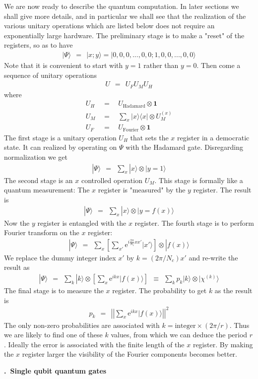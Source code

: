 \documentclass[onecolumn,fleqn, 11pt]{revtex4}
\newcommand{\eexp}{\mathrm{e}^}
\newcommand{\tbox}[1]{\text{#1}}
\newcommand{\beq}{\begin{eqnarray}}
\newcommand{\eeq}{\end{eqnarray}}
\renewcommand{\thesubsection}{\arabic{subsection}}
\renewcommand{\thesubsubsection}{\arabic{subsubsection}}
\newcommand{\sheadC}[1]
{
\addtocounter{subsubsection}{1}
\vspace{5mm}
{\bf \thesubsection.\thesubsubsection \ #1}  
\nopagebreak
\phantomsection
}
\begin{document}
We are now ready to describe the quantum computation.
In later sections we shall give more details, 
and in particular we shall see that the realization 
of the various unitary operations which are 
listed below does not require an exponentially 
large hardware.   
The preliminary stage is to make a "reset" 
of the registers, so as to have 
\beq
|\Psi \rangle \ \ = \ \ |x ; y\rangle = | 0,0,0,...,0,0 ; 1,0,0,...,0,0 \rangle
\eeq
Note that it is convenient to start with $y=1$ rather than $y=0$. 
Then come a sequence of unitary operations 
\beq
U \ \ = \ \ U_F U_M U_H
\eeq
where
\beq
U_H \ \ &=& \ \ U_{\tbox{Hadamard}} \otimes \bm{1} \\
U_M \ \ &=& \ \ \sum_x |x\rangle\langle x| \otimes  U_M^{(x)} \\
U_F \ \ &=& \ \ U_{\tbox{Fourier}} \otimes \bm{1}
\eeq
The first stage is a unitary operation $U_H$ that 
sets the $x$ register in a democratic state.
It can realized by operating on $\Psi$ with 
the Hadamard gate. Disregarding normalization we get   
\beq
|\Psi \rangle \ \ = \ \ \sum_x |x \rangle \otimes   | y{=}1 \rangle 
\eeq
The second stage is an $x$ controlled operation $U_M$.
This stage is formally like a quantum measurement: 
The $x$ register is "measured" by the $y$ register.  
The result is 
\beq
|\Psi \rangle \ \ = \ \ \sum_x |x \rangle \otimes  | y{=}f(x) \rangle 
\eeq
Now the $y$ register is entangled with the $x$ register. 
The fourth stage is to perform Fourier transform 
on the $x$ register:
\beq
|\Psi \rangle \ \ = \ \ \sum_x 
\left[ \sum_{x'}  \eexp{i\frac{2\pi}{N_c}xx'} |x' \rangle \right] 
\otimes   | f(x) \rangle 
\eeq
We replace the dummy integer index $x'$ by $k=(2\pi/N_c)x'$ 
and re-write the result as  
\beq
|\Psi \rangle \ \ = \ \ \sum_k   |k \rangle  \otimes   
\left[ \sum_x  \eexp{ikx} |f(x) \rangle \right] 
\ \ \equiv \ \ 
\sum_k p_k |k\rangle \otimes |\chi^{(k)}\rangle
\eeq
The final stage is to measure the $x$ register. 
The probability to get $k$ as the result is 
\beq  
p_k \ \ = \ \ 
\left|\left|
\sum_x  \eexp{ikx} |f(x) \rangle
\right|\right|^2 
\eeq
The only non-zero probabilities are associated 
with $k=\mbox{integer} \times (2\pi/r)$.
Thus we are likely to find one of these $k$ values, 
from which we can deduce the period $r$. 
Ideally the error is associated with the 
finite length of the $x$ register. By making 
the $x$ register larger the visibility of the Fourier 
components becomes better.  





\sheadC{Single qubit quantum gates}
\end{document}
